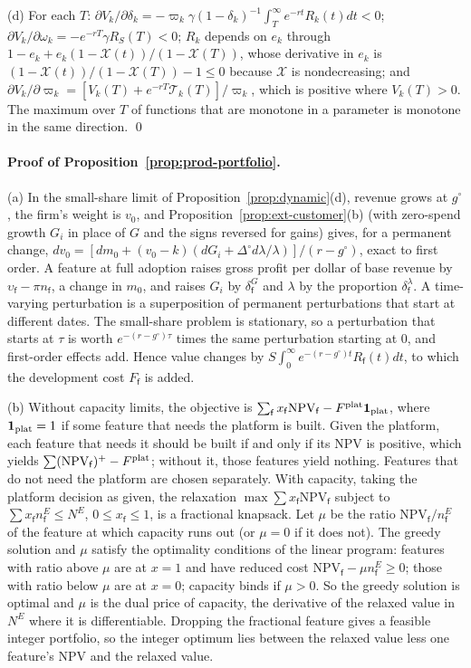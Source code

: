 (d) For each $T$: $\partial V_k/\partial\delta_k=-\varpi_k\gamma(1-\delta_k)^{-1}\int_T^\infty e^{-rt}R_k(t)dt<0$; $\partial V_k/\partial\omega_k=-e^{-rT}\gamma R_S(T)<0$; $R_k$ depends on $e_k$ through $1-e_k+e_k(1-\mathcal X(t))/(1-\mathcal X(T))$, whose derivative in $e_k$ is $(1-\mathcal X(t))/(1-\mathcal X(T))-1\le 0$ because $\mathcal X$ is nondecreasing; and $\partial V_k/\partial\varpi_k=[V_k(T)+e^{-rT}\mathcal T_k(T)]/\varpi_k$, which is positive where $V_k(T)>0$. The maximum over $T$ of functions that are monotone in a parameter is monotone in the same direction. \qed

\paragraph{Proof of Proposition~\ref{prop:prod-portfolio}.}
(a) In the small-share limit of Proposition~\ref{prop:dynamic}(d), revenue grows at $g^\circ$, the firm's weight is $v_0$, and Proposition~\ref{prop:ext-customer}(b) (with zero-spend growth $G_i$ in place of $G$ and the signs reversed for gains) gives, for a permanent change, $dv_0=[dm_0+(v_0-k)(dG_i+\Delta^\circ d\lambda/\lambda)]/(r-g^\circ)$, exact to first order. A feature at full adoption raises gross profit per dollar of base revenue by $\upsilon_{\mathsf f}-\pi n_{\mathsf f}$, a change in $m_0$, and raises $G_i$ by $\delta^G_{\mathsf f}$ and $\lambda$ by the proportion $\delta^\lambda_{\mathsf f}$. A time-varying perturbation is a superposition of permanent perturbations that start at different dates. The small-share problem is stationary, so a perturbation that starts at $\tau$ is worth $e^{-(r-g^\circ)\tau}$ times the same perturbation starting at 0, and first-order effects add. Hence value changes by $S\int_0^\infty e^{-(r-g^\circ)t}R_{\mathsf f}(t)dt$, to which the development cost $F_{\mathsf f}$ is added.

(b) Without capacity limits, the objective is $\sum_{\mathsf f}x_{\mathsf f}\mathrm{NPV}_{\mathsf f}-F^{\rm plat}\mathbf 1_{\rm plat}$, where $\mathbf 1_{\rm plat}=1$ if some feature that needs the platform is built. Given the platform, each feature that needs it should be built if and only if its NPV is positive, which yields $\sum(\mathrm{NPV}_{\mathsf f})^+-F^{\rm plat}$; without it, those features yield nothing. Features that do not need the platform are chosen separately. With capacity, taking the platform decision as given, the relaxation $\max\sum x_{\mathsf f}\mathrm{NPV}_{\mathsf f}$ subject to $\sum x_{\mathsf f}n^E_{\mathsf f}\le N^E$, $0\le x_{\mathsf f}\le 1$, is a fractional knapsack. Let $\mu$ be the ratio $\mathrm{NPV}_{\mathsf f}/n^E_{\mathsf f}$ of the feature at which capacity runs out (or $\mu=0$ if it does not). The greedy solution and $\mu$ satisfy the optimality conditions of the linear program: features with ratio above $\mu$ are at $x=1$ and have reduced cost $\mathrm{NPV}_{\mathsf f}-\mu n^E_{\mathsf f}\ge 0$; those with ratio below $\mu$ are at $x=0$; capacity binds if $\mu>0$. So the greedy solution is optimal and $\mu$ is the dual price of capacity, the derivative of the relaxed value in $N^E$ where it is differentiable. Dropping the fractional feature gives a feasible integer portfolio, so the integer optimum lies between the relaxed value less one feature's NPV and the relaxed value.

